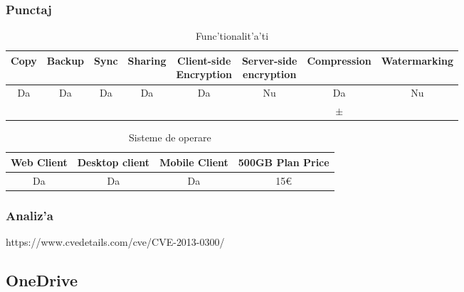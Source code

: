 \documentclass[12pt,a4paper,twoside]{report}
\newcommand{\greencheck}{\color{green}  \ding{51}}
\newcommand{\orangepm}{\color{orange} \textbf{$\pm$}}
\newcommand{\redxmark}{\color{red} \ding{55}}
\begin{document}
\subsubsection{Punctaj}
\begin{table}[H]
\centering
\caption{Func'tionalit'a'ti}
\begin{tabular}{|c|c|c|c|c|c|c|c|}          
\hline               
Copy & Backup & Sync & Sharing & \makecell{Client-side\\ Encryption} & \makecell{Server-side \\ encryption} & Compression & Watermarking \\ [0.5ex]   
\hline 
Da & Da & Da & Da & Da & Nu & Da & Nu    \\                      
\greencheck & \greencheck\greencheck & \greencheck & \greencheck & \greencheck\greencheck & \redxmark\redxmark &  \orangepm &  \redxmark\redxmark  \\               
\hline                              
\end{tabular}
\label{table:googledrivefeaturetable}             
\end{table}
\begin{table}[H]
\centering
\caption{Sisteme de operare}
\begin{tabular}{|c|c|c|c|}          
\hline                      
 Web Client & Desktop client & Mobile Client & 500GB Plan Price\\ [0.5ex]   
\hline                            
Da & Da & Da & 15\euro \\               
\hline                              
\end{tabular}
\label{table:googledrivesystemtable}             
\end{table}
\subsubsection{Analiz'a}
https://www.cvedetails.com/cve/CVE-2013-0300/
\subsection{OneDrive}
\end{document}
